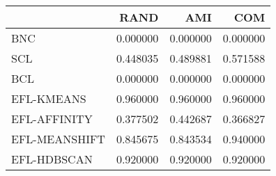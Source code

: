\begin{tabular}{lrrr}
\toprule
 & RAND & AMI & COM \\
\midrule
BNC & 0.000000 & 0.000000 & 0.000000 \\
SCL & 0.448035 & 0.489881 & 0.571588 \\
BCL & 0.000000 & 0.000000 & 0.000000 \\
EFL-KMEANS & 0.960000 & 0.960000 & 0.960000 \\
EFL-AFFINITY & 0.377502 & 0.442687 & 0.366827 \\
EFL-MEANSHIFT & 0.845675 & 0.843534 & 0.940000 \\
EFL-HDBSCAN & 0.920000 & 0.920000 & 0.920000 \\
\bottomrule
\end{tabular}
